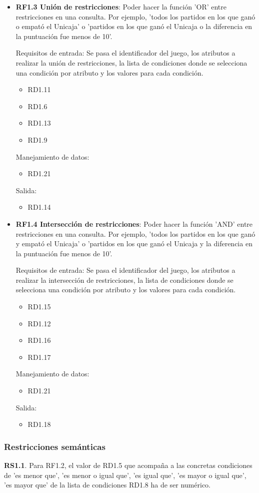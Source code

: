 \begin{itemize}
	
	\item \textbf{RF1.3 Unión de restricciones}: Poder hacer la función 'OR' entre restricciones en una consulta. Por ejemplo, 'todos los partidos en los que ganó o empató el Unicaja' o 'partidos en los que ganó el Unicaja o la diferencia en la puntuación fue menos de 10'.
	
	Requisitos de entrada: Se pasa el identificador del juego, los atributos a realizar la unión de restricciones, la lista de condiciones donde se selecciona una condición por atributo y los valores para cada condición.
	\begin{itemize}
		\item RD1.11
		\item RD1.6
		\item RD1.13
		\item RD1.9
	\end{itemize}
	Manejamiento de datos: 
	\begin{itemize}
		\item RD1.21
	\end{itemize}
	Salida:
	\begin{itemize}
		\item RD1.14
	\end{itemize}
	
	
	\item \textbf{RF1.4 Intersección de restricciones}: Poder hacer la función 'AND' entre restricciones en una consulta. Por ejemplo, 'todos los partidos en los que ganó y empató el Unicaja' o 'partidos en los que ganó el Unicaja y la diferencia en la puntuación fue menos de 10'.
	
	Requisitos de entrada: Se pasa el identificador del juego, los atributos a realizar la intersección de restricciones, la lista de condiciones donde se selecciona una condición por atributo y los valores para cada condición.
	\begin{itemize}
		\item RD1.15
		\item RD1.12
		\item RD1.16
		\item RD1.17
	\end{itemize}
	Manejamiento de datos: 
	\begin{itemize}
		\item RD1.21
	\end{itemize}
	Salida:
	\begin{itemize}
		\item RD1.18
	\end{itemize}
\end{itemize}




\subsubsection{Restricciones semánticas}

\textbf{RS1.1}. Para RF1.2, el valor de RD1.5 que acompaña a las concretas condiciones de 'es menor que', 'es menor o igual que', 'es igual que', 'es mayor o igual que', 'es mayor que' de la lista de condiciones RD1.8 ha de ser numérico.